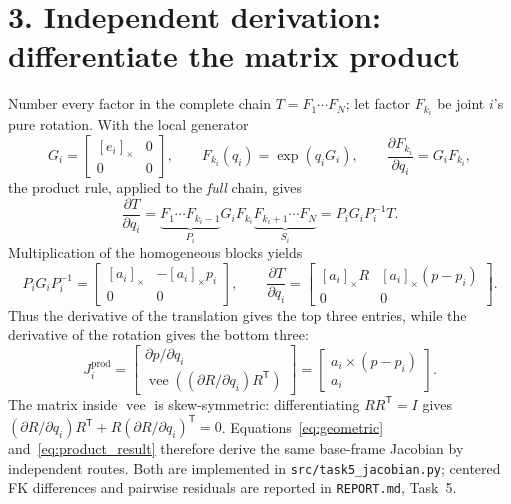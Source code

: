 \documentclass[10pt,a4paper]{article}
\begin{document}
\section*{3. Independent derivation: differentiate the matrix product}
Number every factor in the complete chain $T=F_1\cdots F_N$; let factor
$F_{k_i}$ be joint $i$'s pure rotation. With the local generator
\begin{equation}
G_i=\begin{bmatrix}[e_i]_\times&0\\0&0\end{bmatrix},
\qquad F_{k_i}(q_i)=\exp(q_iG_i),
\qquad \frac{\partial F_{k_i}}{\partial q_i}=G_iF_{k_i},
\end{equation}
the product rule, applied to the \emph{full} chain, gives
\begin{equation}
\frac{\partial T}{\partial q_i}
=\underbrace{F_1\cdots F_{k_i-1}}_{P_i}
G_iF_{k_i}
\underbrace{F_{k_i+1}\cdots F_N}_{S_i}
=P_iG_iP_i^{-1}T.
\label{eq:product}
\end{equation}
Multiplication of the homogeneous blocks yields
\begin{equation}
P_iG_iP_i^{-1}
=\begin{bmatrix}[a_i]_\times&-[a_i]_\times p_i\\0&0\end{bmatrix},
\qquad
\frac{\partial T}{\partial q_i}
=\begin{bmatrix}
[a_i]_\times R & [a_i]_\times(p-p_i)\\0&0
\end{bmatrix}.
\end{equation}
Thus the derivative of the translation gives the top three entries, while
the derivative of the rotation gives the bottom three:
\begin{equation}
J_i^{\mathrm{prod}}=
\begin{bmatrix}
\partial p/\partial q_i\\
\operatorname{vee}((\partial R/\partial q_i)R^\mathsf{T})
\end{bmatrix}
=\begin{bmatrix}a_i\times(p-p_i)\\a_i\end{bmatrix}.
\label{eq:product_result}
\end{equation}
The matrix inside $\operatorname{vee}$ is skew-symmetric: differentiating
$RR^\mathsf{T}=I$ gives
$(\partial R/\partial q_i)R^\mathsf{T}
+R(\partial R/\partial q_i)^\mathsf{T}=0$.
Equations~\eqref{eq:geometric} and~\eqref{eq:product_result} therefore
derive the same base-frame Jacobian by independent routes. Both are
implemented in \texttt{src/task5\_jacobian.py}; centered FK differences and
pairwise residuals are reported in \texttt{REPORT.md}, Task~5.
\end{document}

